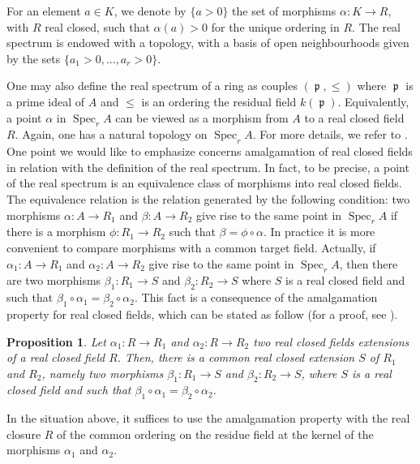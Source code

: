 \documentclass[12pt]{amsart}
\newtheorem{prop}[thm]{Proposition}
\theoremstyle{definition}
\DeclareMathOperator{\Sp}{Spec}
\DeclareMathOperator{\p}{\mathfrak{p}}
\begin{document}
For an element $a\in K$, we denote by $\{a>0\}$ the set of morphisms $\alpha:K\to R$, with $R$ real closed, such that $\alpha(a)>0$ for the unique ordering in $R$. The real spectrum is endowed with a topology, with a basis of open neighbourhoods given by the sets $\{ a_1>0,\ldots , a_r>0\}$.

One may also define the real spectrum of a ring as couples $(\p,\leq)$ where $\p$ is a prime ideal of $A$ and $\leq$ is an ordering the residual field 
$k(\p)$. Equivalently, a point $\alpha$ in $\Sp_rA$ can be viewed as a morphism from $A$ to a real closed field $R$. Again, one has a natural topology on $\Sp_rA$. For more details, we refer to \cite{BCR}.\\

One point we would like to emphasize concerns amalgamation of real closed fields in relation with the definition of the real spectrum. 
In fact, to be precise, a point of the real spectrum is an equivalence class of morphisms into  real closed fields. The equivalence relation is the relation generated by the following condition: two morphisms $\alpha:A\to R_1$ and $\beta:A\to R_2$ give rise to the same point in $\Sp_rA$ if there is a morphism $\phi: R_1\to R_2$ such that $\beta=\phi\circ\alpha$. In practice it is more convenient to compare morphisms with a common target field. Actually, 
if  $\alpha_1:A\to R_1$ and $\alpha_2:A\to R_2$ give rise to the same point in $\Sp_rA$, then there are two morphisms 
$\beta_1: R_1\to S$ and $\beta_2: R_2\to S$
where $S$ is a real closed field and such that $\beta_1\circ\alpha_1=\beta_2\circ\alpha_2$. This fact is a consequence of the amalgamation property for real closed fields, which can be stated as follow  (for a proof, see \cite[Ex 1.4.3 P35]{Sch}). 

\begin{prop}\label{Amalgamation}
	Let $\alpha_1: R\to R_1$ and $\alpha_2: R\to R_2$ two real closed fields extensions of a real closed field $R$. Then, there is a common real closed  extension $S$ of $R_1$ and $R_2$, namely two morphisms 
	$\beta_1: R_1\to S$ and $\beta_2: R_2\to S$, where $S$ is a real closed field and such that $\beta_1\circ\alpha_1=\beta_2\circ\alpha_2$.
\end{prop}

In the situation above, it suffices to use the amalgamation property
with the real closure $R$ of the common ordering on the residue field at the kernel of the morphisms $\alpha_1$ and $\alpha_2$. 
\end{document}

